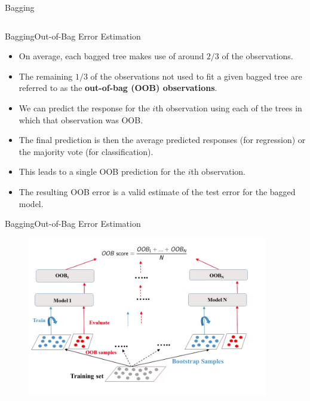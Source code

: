 \begin{frame}{Bagging}
\begin{columns}[T]
    
\end{columns}


\end{frame}


\begin{frame}{Bagging}{Out-of-Bag Error Estimation}

    \begin{itemize}
        \item On average, each bagged tree makes use of around $2/3$ of the observations. \pause 
        \item The remaining $1/3$ of the observations not used to fit a given bagged tree are referred to as the \textbf{out-of-bag (OOB) observations}. \pause 
        \item We can predict the response for the $i$th observation using each of the trees in which that observation was OOB.  \pause 
        \item The final prediction is then the average predicted responses (for regression) or the majority vote (for classification). \pause 
        \item This leads to a single OOB prediction for the $i$th observation. \pause 
        \item The resulting OOB error is a valid estimate of the test error for the bagged model. 
        
    \end{itemize}

    
\end{frame}

\begin{frame}{Bagging}{Out-of-Bag Error Estimation}

\begin{figure}
    \centering
    \includegraphics[height=7cm]{bagging-boosting/oob.png}
\end{figure}
    
\end{frame}

